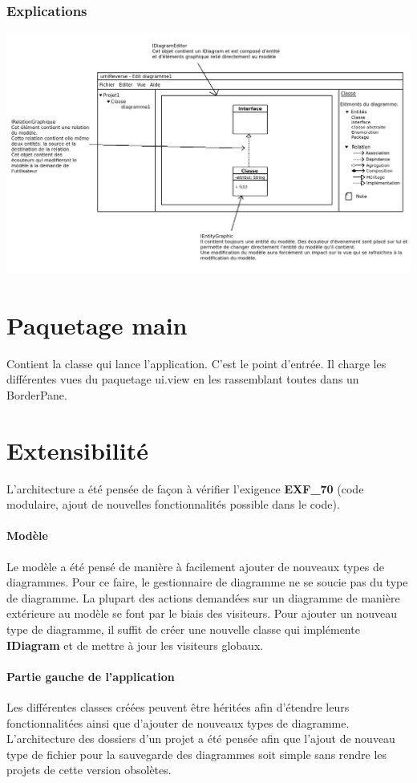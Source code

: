 \documentclass[a4paper,10pt]{article}
\begin{document}
	\subsubsection{Explications}
	  \begin{center}
	    \includegraphics[width=\textwidth]{imgDAL/demonstration.png}
	  \end{center}
      
          
\section{Paquetage main}
    Contient la classe qui lance l'application. C'est le point d'entrée. Il charge les différentes 
    vues du paquetage ui.view en les rassemblant toutes dans un BorderPane.
    
\section{Extensibilité}
  L'architecture a été pensée de façon à vérifier l'exigence \textbf{EXF\_70} (code modulaire, 
  ajout de nouvelles fonctionnalités possible dans le code).
  \paragraph{Modèle}
    Le modèle a été pensé de manière à facilement ajouter de nouveaux types de diagrammes. 
    Pour ce faire, le gestionnaire de diagramme ne se soucie pas du type de diagramme.
    La plupart des actions demandées sur un diagramme de manière extérieure au modèle se font par 
    le biais des visiteurs. Pour ajouter un nouveau type de diagramme, il suffit de créer une nouvelle 
    classe qui implémente \textbf{IDiagram} et de mettre à jour les visiteurs globaux.
  \paragraph{Partie gauche de l'application}
    Les différentes classes créées peuvent être héritées afin d'étendre leurs fonctionnalitées ainsi 
    que d'ajouter de nouveaux types de diagramme. 
    L'architecture des dossiers d'un projet a été pensée afin que l'ajout de nouveau type de fichier 
    pour la sauvegarde des diagrammes soit simple sans rendre les projets de cette version obsolètes.
\end{document}
